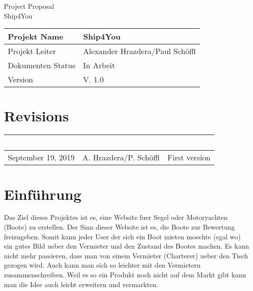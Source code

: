\documentclass[12pt]{article}
\theoremstyle{definition}
\newcommand{\projectname}{Ship4You}
\newcommand{\productname}{Ship4You}
\newcommand{\projectleader}{Alexander Hrazdera/Paul Schöffl}
\newcommand{\documentstatus}{In Arbeit}
\newcommand{\version}{V. 1.0}
\begin{document}
\begin{titlepage}

\vspace{10em}

\begin{center}
{\Huge Project Proposal} \\[3em]
{\LARGE \productname} \\[3em]
\end{center}

\begin{flushleft} 
\begin{tabular}{|l|l|}
\hline
Projekt Name & \projectname \\ \hline
Projekt Leiter & \projectleader \\ \hline
Dokumenten Status & \documentstatus \\ \hline
Version & \version \\ \hline
\end{tabular}
\end{flushleft}

\end{titlepage}
\section*{Revisions}
\begin{tabular}{|l|l|l|}
\hline
\cellcolor[gray]{0.5}\textcolor{white}{Date} & \cellcolor[gray]{0.5}\textcolor{white}{Author} & \cellcolor[gray]{0.5}\textcolor{white}{Change} \\ \hline
September 19, 2019&A. Hrazdera/P. Schöffl&First version \\ \hline
\end{tabular}

\pagebreak

\tableofcontents

\pagebreak

\section{Einführung}
Das Ziel dieses Projektes ist es, eine Website fuer Segel oder Motoryachten (Boote) zu erstellen. Der Sinn dieser Website ist es, die Boote zur Bewertung freizugeben. Somit kann jeder User der sich ein Boot mieten moechte (egal wo) ein gutes Bild ueber den Vermieter und den Zustand des Bootes machen. Es kann nicht mehr passieren, dass man von einem Vermieter (Charterer) ueber den Tisch gezogen wird. Auch kann man sich so leichter mit den Vermietern zusammenschreiben. Weil es so ein Produkt noch nicht auf dem Markt gibt kann man die Idee auch leicht erweitern und vermarkten. 
\end{document}
